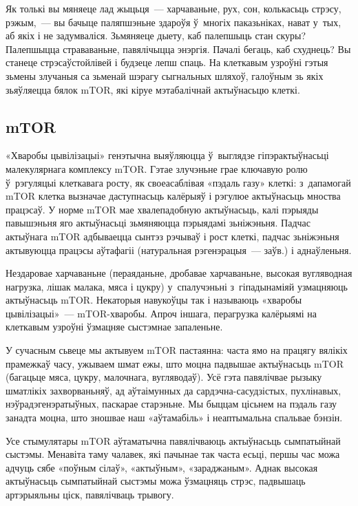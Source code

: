 Як толькі вы мяняеце лад жыцьця~--- харчаваньне, рух, сон, колькасьць стрэсу, рэжым,~--- вы бачыце паляпшэньне здароўя ў~многіх паказьніках, нават у~тых, аб якіх і не задумваліся. Зьмяняеце дыету, каб палепшыць стан скуры? Палепшыцца страваваньне, павялічыцца энэргія. Пачалі бегаць, каб схуднець? Вы станеце стрэсаўстойлівей і будзеце лепш спаць. На клеткавым узроўні гэтыя зьмены злучаныя са зьменай шэрагу сыгнальных шляхоў, галоўным зь якіх зьяўляецца бялок mTOR, які кіруе мэтабалічнай актыўнасьцю клеткі.

\subsection*{mTOR}

«Хваробы цывілізацыі» генэтычна выяўляюцца ў~выглядзе гіпэрактыўнасьці малекулярнага комплексу mTOR. Гэтае злучэньне грае ключавую ролю ў~рэгуляцыі клеткавага росту, як своеасаблівая «пэдаль газу» клеткі: з~дапамогай mTOR клетка вызначае даступнасьць калёрыяў і рэгулюе актыўнасьць мноства працэсаў. У норме mTOR мае хвалепадобную актыўнасьць, калі пэрыяды павышэньня яго актыўнасьці зьмяняюцца пэрыядамі зьніжэньня. Падчас актыўнага mTOR адбываецца сынтэз рэчываў і рост клеткі, падчас зьніжэньня актывуюцца працэсы аўтафагіі (натуральная рэгенэрацыя~--- заўв.) і аднаўленьня.


Нездаровае харчаваньне (пераяданьне, дробавае харчаваньне, высокая вугляводная нагрузка, лішак малака, мяса і цукру) у~спалучэньні з~гіпадынаміяй узмацняюць актыўнасьць mTOR. Некаторыя навукоўцы так і называюць «хваробы цывілізацыі»~--- mTOR-хваробы. Апроч іншага, перагрузка калёрыямі на клеткавым узроўні ўзмацняе сыстэмнае запаленьне.

У сучасным сьвеце мы актывуем mTOR пастаянна: часта ямо на працягу вялікіх прамежкаў часу, ужываем шмат ежы, што моцна падвышае актыўнасьць mTOR (багацьце мяса, цукру, малочнага, вугляводаў). Усё гэта павялічвае рызыку шматлікіх захворваньняў, ад аўтаімунных да сардэчна-сасудзістых, пухлінавых, нэўрадэгенэратыўных, паскарае старэньне. Мы быццам цісьнем на пэдаль газу занадта моцна, што зношвае наш «аўтамабіль» і неаптымальна спальвае бэнзін.

Усе стымулятары mTOR аўтаматычна павялічваюць актыўнасьць сымпатыйнай сыстэмы. Менавіта таму чалавек, які пачынае так часта есьці, першы час можа адчуць сябе «поўным сілаў», «актыўным», «зараджаным». Аднак высокая актыўнасьць сымпатыйнай сыстэмы можа ўзмацняць стрэс, падвышаць артэрыяльны ціск, павялічваць трывогу.

